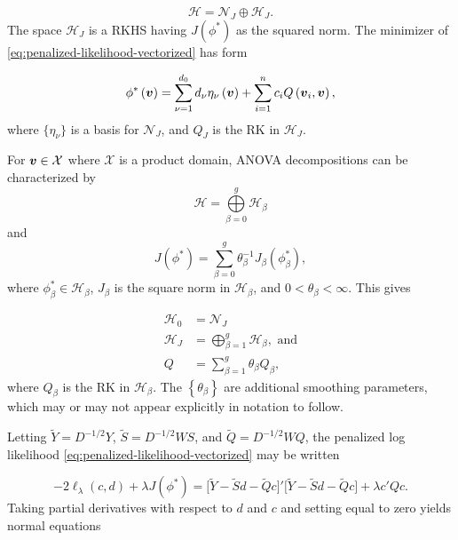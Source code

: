 \documentclass[12pt]{article}
\newcommand{\Hilbert}{\mathcal{H}}
\newcommand{\tildeY}{\tilde{Y}}
\newcommand{\tildeQ}{\tilde{Q}}
\newcommand{\tildeS}{\tilde{S}}
\newcommand{\bfv}{\mbox{\boldmath $v$}}
\theoremstyle{definition}
\begin{document}
\[
\Hilbert = \mathcal{N}_J \oplus \Hilbert_J.
\]
\noindent
The space $\Hilbert_J$ is a RKHS having $J\left(\phi^*\right)$ as the squared norm. The minimizer of \ref{eq:penalized-likelihood-vectorized} has form 

\begin{equation} \label{eq:RKHS-functional-form}
\phi^*\left(\bfv\right) = \sum_{\nu = 1}^{d_0} d_\nu \eta_\nu\left( \bfv \right) + \sum_{i=1}^n c_i Q\left(\bfv_i, \bfv \right),
\end{equation} 
\bigskip
\noindent
where $\lbrace \eta_\nu \rbrace$ is a basis for $\mathcal{N}_J$, and $Q_J$ is the RK in $\Hilbert_J$. 

\bigskip

For $\bfv \in \mathcal{X}$ where $\mathcal{X}$ is a product domain, ANOVA decompositions can be characterized by 
\begin{equation*}
\Hilbert = \bigoplus\limits_{\beta=0}^{g} \Hilbert_\beta
\end{equation*}
\noindent
and
\begin{equation*}
J\left(\phi^*\right) = \sum_{\beta=0}^{g} \theta^{-1}_\beta J_\beta \left( \phi^*_\beta \right),
\end{equation*}
\noindent
where $\phi^*_\beta \in \Hilbert_\beta$, $J_\beta$ is the square norm in $\Hilbert_\beta$, and $0 < \theta_\beta < \infty$. This gives 

\begin{align*}
\Hilbert_0 &= \mathcal{N}_J \\
\Hilbert_J &= \bigoplus\limits_{\beta=1}^{g} \Hilbert_\beta, \mbox{ and} \\
Q &= \sum_{\beta=1}^g \theta_\beta Q_\beta,
\end{align*}
\noindent
where $Q_\beta$ is the RK in $\Hilbert_\beta$. The $\left \{ \theta_\beta \right\}$ are additional smoothing parameters, which may or may not appear explicitly in notation to follow. 

\bigskip

Letting $\tildeY = D^{-1/2} Y$, $\tildeS = D^{-1/2} W S$, and $\tildeQ = D^{-1/2} W Q$, the penalized log likelihood \ref{eq:penalized-likelihood-vectorized} may be written

\begin{equation}\label{eq:penalized-loglik-tilde-vectorized}
-2\ell_\lambda \left(c, d \right) + \lambda J\left( \phi^* \right) = \bigg[ \tildeY - \tildeS d - \tildeQ c\bigg]'\bigg[ \tildeY - \tildeS d - \tildeQ c\bigg] + \lambda c'Qc.
\end{equation}
\noindent
Taking partial derivatives with respect to $d$ and $c$ and setting equal to zero yields normal equations 
\end{document}
